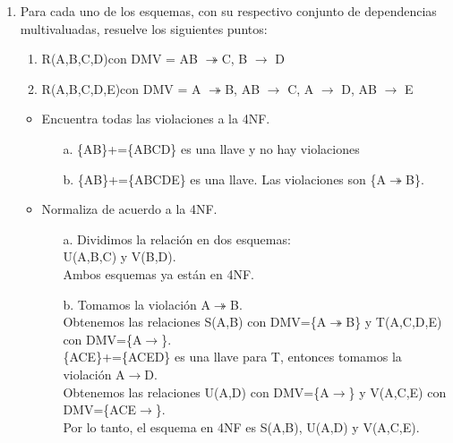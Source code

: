 \documentclass[a4paper, 12pt]{report}
\begin{document}
\begin{enumerate}
\begin{enumerate}
\end{enumerate}
\item Para  cada  uno  de  los  esquemas,  con  su  respectivo  conjunto  de  dependencias  multivaluadas, resuelve los siguientes puntos:\\
\begin{enumerate}
	\item R(A,B,C,D)con DMV = {AB $\twoheadrightarrow$C, B $\rightarrow$ D}
	\item R(A,B,C,D,E)con DMV = { A $\twoheadrightarrow$B, AB $\rightarrow$ C, A $\rightarrow$ D, AB $\rightarrow$ E}\\
\end{enumerate}
\begin{itemize}
	\item Encuentra todas las violaciones a la 4NF.\\
        \begin{itemize}
        \item[a.]\{AB\}+=\{ABCD\} es una llave y no hay violaciones
        \item[b.]\{AB\}+=\{ABCDE\} es una llave. Las violaciones son
            \{A$\twoheadrightarrow$B\}.\\
        \end{itemize}
	\item Normaliza de acuerdo a la 4NF.\\
    \begin{itemize}
        \item[a.] Dividimos la relación en dos esquemas:\\
            U(A,B,C) y V(B,D).\\
            Ambos esquemas ya están en 4NF.
        \item[b.] Tomamos la violación A$\twoheadrightarrow$B.\\
            Obtenemos las relaciones S(A,B) con DMV=\{A$\twoheadrightarrow$B\} y
            T(A,C,D,E) con DMV=\{A$\rightarrow$\}.\\
            \{ACE\}+=\{ACED\} es una llave para T, entonces tomamos la violación
            A$\rightarrow$D.\\
            Obtenemos las relaciones U(A,D) con DMV=\{A$\rightarrow$\} y
            V(A,C,E) con DMV=\{ACE$\rightarrow$\}.\\
            Por lo tanto, el esquema en 4NF es S(A,B), U(A,D) y V(A,C,E).
    \end{itemize}
\end{itemize}


\end{enumerate}
\end{document}
